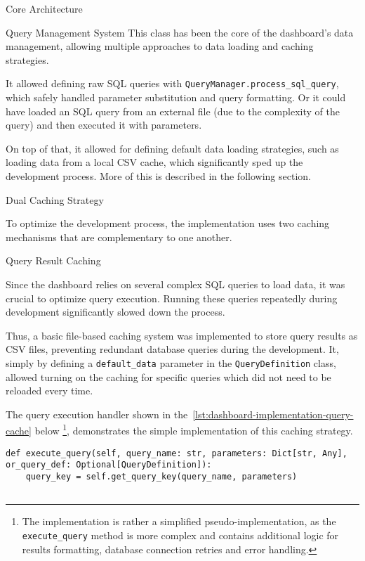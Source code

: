 \begin{section}{Core Architecture}
\begin{subsection}{Query Management System}
		This class has been the core of the dashboard's data management, allowing multiple approaches to data loading and caching strategies.

		It allowed defining raw SQL queries with \texttt{QueryManager.process\_sql\_query}, which safely handled parameter substitution and query formatting.
		Or it could have loaded an SQL query from an external file (due to the complexity of the query) and then executed it with parameters.

		On top of that, it allowed for defining default data loading strategies, such as loading data from a local CSV cache, which significantly sped up the development process.
		More of this is described in the following section.
	\end{subsection}

	\begin{subsection}{Dual Caching Strategy}
		\label{subsec:implementation-core-architecture-caching}

		To optimize the development process, the implementation uses two caching mechanisms that are complementary to one another.

		\begin{subsubsection}{Query Result Caching}
			\label{subsubsec:implementation-core-architecture-query-cache}

			Since the dashboard relies on several complex SQL queries to load data, it was crucial to optimize query execution.
			Running these queries repeatedly during development significantly slowed down the process.

			Thus, a basic file-based caching system was implemented to store query results as CSV files, preventing redundant database queries during the development.
			It, simply by defining a \texttt{default\_data} parameter in the \texttt{QueryDefinition} class, allowed turning on the caching for specific queries which did not need to be reloaded every time.

			The query execution handler shown in the~\autoref{lst:dashboard-implementation-query-cache} below
			\footnote{The implementation is rather a simplified pseudo-implementation, as the \texttt{execute\_query} method is more complex and contains additional logic for results formatting, database connection retries and error handling.},
			demonstrates the simple implementation of this caching strategy.

			\begin{listing}[h]
				\caption{Query Result Caching Implementation}
				\begin{verbatim}
def execute_query(self, query_name: str, parameters: Dict[str, Any], or_query_def: Optional[QueryDefinition]):
    query_key = self.get_query_key(query_name, parameters)


\end{verbatim}
\end{listing}
\end{subsubsection}
\end{subsection}
\end{section}
